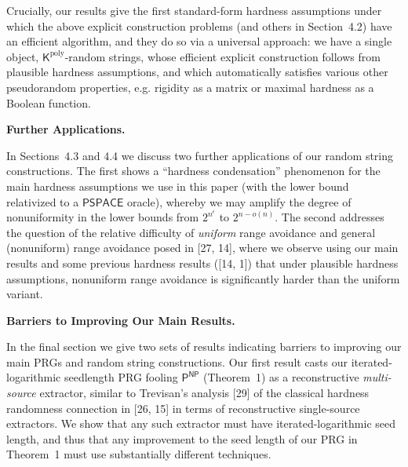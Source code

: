 \documentclass[10pt,a4paper]{article}
\begin{document}



Crucially, our results give the first standard-form hardness assumptions under which the above explicit construction problems (and others in Section 4.2) have an efficient algorithm, and they do so via a universal approach: we have a single object, ${\mathsf{K}}^{\mathrm{poly}}$-random strings, whose efficient explicit construction follows from plausible hardness assumptions, and which automatically satisfies various other pseudorandom properties, e.g. rigidity as a matrix or maximal hardness as a Boolean function.\par





\par\medskip\noindent\textbf{Further Applications.}\par




In Sections 4.3 and 4.4 we discuss two further applications of our random string constructions. The first shows a “hardness condensation” phenomenon for the main hardness assumptions we use in this paper (with the lower bound relativized to a $\mathsf{PSPACE}$ oracle), whereby we may amplify the degree of nonuniformity in the lower bounds from $2^{n^{\epsilon}}$ to $2^{n-o(n)}$.
The second addresses the question of the relative difficulty of \emph{uniform} range avoidance and general (nonuniform) range avoidance posed in [27, 14], where we observe using our main results and some previous hardness results ([14, 1]) that under plausible hardness assumptions, nonuniform range avoidance is significantly harder than the uniform variant.\par





\par\medskip\noindent\textbf{Barriers to Improving Our Main Results.}\par




In the final section we give two sets of results indicating barriers to improving our main PRGs and random string constructions. Our first result casts our iterated-logarithmic seedlength PRG fooling ${\mathsf{P}}^{{\mathsf{NP}}}$ (Theorem 1) as a reconstructive \emph{multi-source} extractor, similar to Trevisan’s analysis [29] of the classical hardness randomness connection in [26, 15] in terms of reconstructive single-source extractors. We show that any such extractor must have iterated-logarithmic seed length, and thus that any improvement to the seed length of our PRG in Theorem 1 must use substantially different techniques.\par
\end{document}
